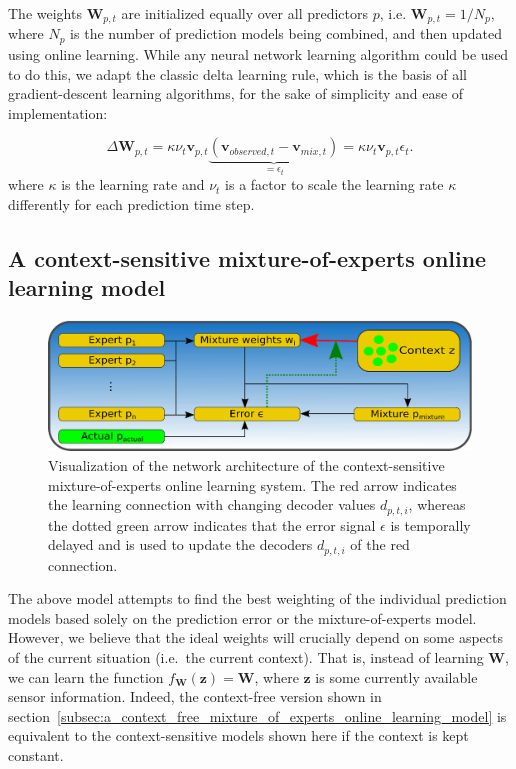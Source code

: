 The weights $ \mathbf{W}_{ p ,t}$ are initialized equally over all predictors $ p$, i.e. $\mathbf{W}_{ p ,t} = 1/N_p$, where $N_p$ is the number of prediction models being combined, and then updated using online learning.
While any neural network learning algorithm could be used to do this, we adapt the classic delta learning rule, which is the basis of all gradient-descent learning algorithms, for the sake of simplicity and ease of implementation:

\begin{equation}
  \label{eq:mix_learning1}
\Delta\mathbf{W}_{p,t} = \kappa \nu_{t} \mathbf{v}_{p,t} \underbrace{(\mathbf{v}_{observed,t}-\mathbf{v}_{mix,t})}_{=\epsilon_t} = \kappa \nu_{t} \mathbf{v}_{p,t} \epsilon_t.
\end{equation}
where $\kappa$ is the learning rate and $\nu_{t}$ is a factor to scale the learning rate $\kappa$ differently for each prediction time step.

\subsection{A context-sensitive mixture-of-experts online learning model}%
\label{subsec:a_context_sensitive_mixture_of_experts_online_learning_model}

\begin{figure}[t!]
    \centering
    \includegraphics[width=\textwidth]{imgs/mix_system_arch.eps}
    \caption{Visualization of the network architecture of the context-sensitive mixture-of-experts online learning system.
    The red arrow indicates the learning connection with changing decoder values $d_{p,t,i}$, whereas the dotted green arrow indicates that the error signal $\epsilon$ is temporally delayed and is used to update the decoders $d_{p,t,i}$ of the red connection.}
    \label{fig:mix_context_sensitive_system_arch}
\end{figure}

The above model attempts to find the best weighting of the individual prediction models based solely on the prediction error or the mixture-of-experts model.
However, we believe that the ideal weights will crucially depend on some aspects of the current situation (i.e.\ the current context).
That is, instead of learning $ \mathbf{W}$, we can learn the function $f_{ \mathbf{W}}( \mathbf{z})= \mathbf{W}$, where $\mathbf{z}$ is some currently available sensor information.
Indeed, the context-free version shown in section~\ref{subsec:a_context_free_mixture_of_experts_online_learning_model} is equivalent to the context-sensitive models shown here if the context is kept constant.

